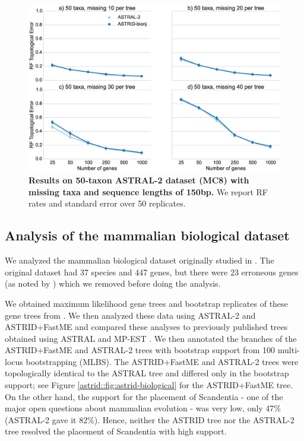 \begin{figure}
  \centering
  \includegraphics[width=12cm]{astrid-figs/astral2-missing.eps}
  \caption[Results on 50-taxon ASTRAL-2 dataset with
missing  taxa ]{\textbf{Results on 50-taxon ASTRAL-2 dataset (MC8) with
missing  taxa 
    and sequence lengths of 150bp.} We
    report RF rates and standard error over 50 replicates. 
}
  \label{astrid::fig:astral2-missing}
\end{figure}



\subsection{Analysis of the mammalian biological dataset}
We analyzed the mammalian biological dataset originally
studied in \cite{song2012}.  
The original
dataset had 37 species and 447 genes, but
there were 23
erroneous genes (as noted by \cite{statbinning}) which
we removed before doing the analysis. 

We obtained maximum likelihood gene trees and bootstrap
replicates of these gene trees from \cite{mirarab2014statistical}.
We then analyzed these
data using ASTRAL-2 and ASTRID+FastME
and compared these analyses to 
previously published trees obtained using ASTRAL
and MP-EST \cite{ASTRAL}. 
We then annotated the branches of the ASTRID+FastME and ASTRAL-2 trees with
bootstrap support from 100 multi-locus bootstrapping (MLBS).
The ASTRID+FastME and ASTRAL-2 trees
were topologically identical to the ASTRAL tree and differed
only in the bootstrap support;  
see Figure \ref{astrid::fig:astrid-biological} for the ASTRID+FastME tree.
On the other hand, the support for
the placement of Scandentia - one of the major
open questions about mammalian evolution - was very low,
only 47\% (ASTRAL-2 gave it 82\%). 
Hence, neither the ASTRID tree nor the ASTRAL-2 tree
resolved the placement of Scandentia
with high support.


